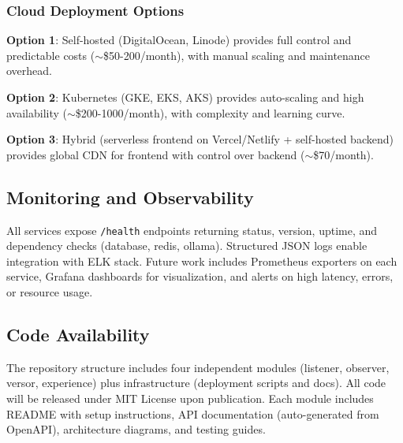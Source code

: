 \subsubsection{Cloud Deployment Options}

\textbf{Option 1}: Self-hosted (DigitalOcean, Linode) provides full control and predictable costs ($\sim$\$50-200/month), with manual scaling and maintenance overhead.

\textbf{Option 2}: Kubernetes (GKE, EKS, AKS) provides auto-scaling and high availability ($\sim$\$200-1000/month), with complexity and learning curve.

\textbf{Option 3}: Hybrid (serverless frontend on Vercel/Netlify + self-hosted backend) provides global CDN for frontend with control over backend ($\sim$\$70/month).

\subsection{Monitoring and Observability}

All services expose \texttt{/health} endpoints returning status, version, uptime, and dependency checks (database, redis, ollama). Structured JSON logs enable integration with ELK stack. Future work includes Prometheus exporters on each service, Grafana dashboards for visualization, and alerts on high latency, errors, or resource usage.

\subsection{Code Availability}

The repository structure includes four independent modules (listener, observer, versor, experience) plus infrastructure (deployment scripts and docs). All code will be released under MIT License upon publication. Each module includes README with setup instructions, API documentation (auto-generated from OpenAPI), architecture diagrams, and testing guides.
